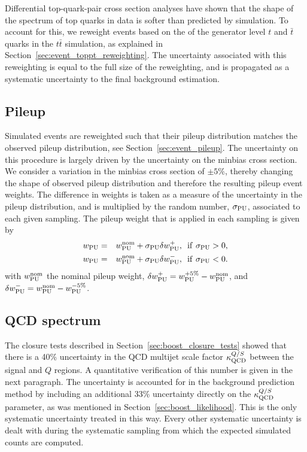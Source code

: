 Differential top-quark-pair cross section analyses have shown that the shape of the \pt spectrum of 
top quarks in data is softer than predicted by simulation. 
To account for this, we reweight events based on the \pt of the generator level $t$ and $\bar{t}$
quarks in the $t\bar{t}$ simulation, as explained in Section~\ref{sec:event_toppt_reweighting}. 
The uncertainty associated with this reweighting is equal to the full size of the
reweighting, and is propagated as a systematic uncertainty to the final background estimation. 

\subsection{Pileup} 

Simulated events are reweighted such that their pileup distribution matches the observed pileup
distribution, see Section~\ref{sec:event_pileup}. The uncertainty on this procedure is largely
driven by the uncertainty on the minbias cross section. We consider a variation in the minbias cross
section of $\pm 5\%$, thereby changing the shape of observed pileup distribution and
therefore the resulting pileup event weights. The difference in weights is taken as a measure of the
uncertainty in the pileup distribution, and is multiplied by the random number, $\sigma_{\rm PU}$,
associated to each given sampling.  The pileup weight that is applied in each sampling is given by
\begin{eqnarray}
w_{\rm PU} & = & w_{\rm PU}^{\rm nom} + \sigma_{\rm PU}\delta w^+_{\rm PU}, \,\,\, {\rm if}
\,\, \sigma_{\rm PU} > 0, \\ 
w_{\rm PU} & = & w_{\rm PU}^{\rm nom} + \sigma_{\rm PU}\delta w^-_{\rm PU}, \,\,\, {\rm if}
\,\, \sigma_{\rm PU} < 0. 
\end{eqnarray}
with $w_{\rm PU}^{\rm nom}$ the nominal pileup weight, $\delta w^+_{\rm PU} = w_{\rm PU}^{+5\%} -
w_{\rm PU}^{\rm nom}$, and $\delta w^-_{\rm PU} = w_{\rm PU}^{\rm nom} - w_{\rm PU}^{-5\%}$.

\subsection{QCD spectrum} 

The closure tests described in Section~\ref{sec:boost_closure_tests} showed that there is a 40\%
uncertainty in the QCD multijet scale factor $\kappa_{\rm QCD}^{Q/S}$ between the signal and $Q$
regions. 
A quantitative verification of this number is given in the next paragraph. 
The uncertainty is accounted for in the background prediction method by including an additional 33\%
uncertainty directly on the $\kappa_{\rm QCD}^{Q/S}$ parameter, as was mentioned in
Section~\ref{sec:boost_likelihood}.
This is the only systematic uncertainty treated in this way. Every other systematic uncertainty is
dealt with during the systematic sampling from which the expected simulated counts are computed.

